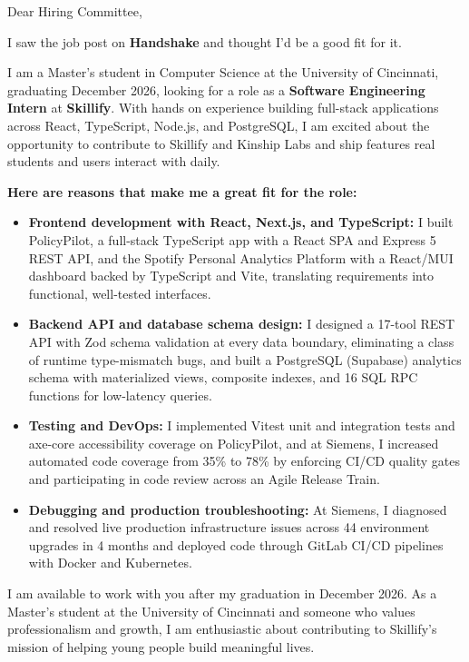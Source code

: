\documentclass[11pt]{letter}
\date{}
\begin{document}
\begin{letter}{}

\opening{Dear Hiring Committee,}

I saw the job post on \textbf{Handshake} and thought I'd be a good fit for it.

I am a Master's student in Computer Science at the University of Cincinnati, graduating December 2026, looking for a role as a \textbf{Software Engineering Intern} at \textbf{Skillify}. With hands on experience building full-stack applications across React, TypeScript, Node.js, and PostgreSQL, I am excited about the opportunity to contribute to Skillify and Kinship Labs and ship features real students and users interact with daily.

\textbf{Here are reasons that make me a great fit for the role:}

\begin{itemize}[leftmargin=*, itemsep=0.45em]
    \item \textbf{Frontend development with React, Next.js, and TypeScript:} I built PolicyPilot, a full-stack TypeScript app with a React SPA and Express 5 REST API, and the Spotify Personal Analytics Platform with a React/MUI dashboard backed by TypeScript and Vite, translating requirements into functional, well-tested interfaces.

    \item \textbf{Backend API and database schema design:} I designed a 17-tool REST API with Zod schema validation at every data boundary, eliminating a class of runtime type-mismatch bugs, and built a PostgreSQL (Supabase) analytics schema with materialized views, composite indexes, and 16 SQL RPC functions for low-latency queries.

    \item \textbf{Testing and DevOps:} I implemented Vitest unit and integration tests and axe-core accessibility coverage on PolicyPilot, and at Siemens, I increased automated code coverage from 35\% to 78\% by enforcing CI/CD quality gates and participating in code review across an Agile Release Train.

    \item \textbf{Debugging and production troubleshooting:} At Siemens, I diagnosed and resolved live production infrastructure issues across 44 environment upgrades in 4 months and deployed code through GitLab CI/CD pipelines with Docker and Kubernetes.
\end{itemize}

I am available to work with you after my graduation in December 2026. As a Master's student at the University of Cincinnati and someone who values professionalism and growth, I am enthusiastic about contributing to Skillify's mission of helping young people build meaningful lives.


\end{letter}
\end{document}
